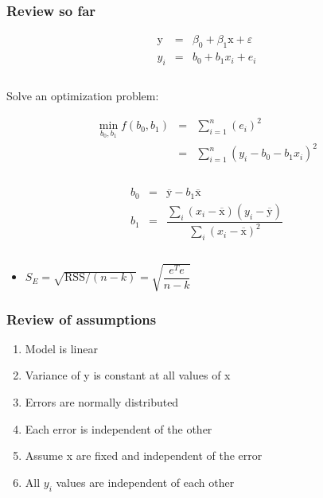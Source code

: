 \begin{frame}\frametitle{Review so far}

	$$
	\begin{array}{rcl}
		\mathrm{y} &=& \beta_0 + \beta_1 \mathrm{x} + \varepsilon \\
		y_i &=& b_0 + b_1 x_i + e_i \\
		\\
	\end{array}
	$$

	Solve an optimization problem:

	$$
	\begin{array}{rcl}
		\min_{\displaystyle b_0, b_1} f(b_0, b_1) &=& \sum_{i=1}^{n}{(e_i)^2} \\
		&=& \sum_{i=1}^{n}{\left(y_i - b_0 - b_1 x_i\right)^2} \\
		\\
	\end{array}
	$$

	$$
	\begin{array}{rcl}
		b_0 &=& \overline{\mathrm{y}} - b_1\overline{\mathrm{x}} \\
		b_1 &=& \dfrac{ \sum_i{\left(x_i - \overline{\mathrm{x}}\right)\left(y_i - \overline{\mathrm{y}}\right) } }{ \sum_i{\left( x_i - \overline{\mathrm{x}}\right)^2} } \\
		\\
	\end{array}
	$$
	\begin{itemize}
		\item	$S_E = \sqrt{\text{RSS}/(n-k)} = \sqrt{\dfrac{ e^Te}{n-k}}$
	\end{itemize}
\end{frame}

\begin{frame}\frametitle{Review of assumptions}
	\begin{enumerate}
		\item	Model is linear
		\item	Variance of y is constant at all values of x
		\item	Errors are normally distributed
		\item	Each error is independent of the other
		\item	Assume x are fixed and independent of the error
		\item	All $y_i$ values are independent of each other
	\end{enumerate}
\end{frame}

